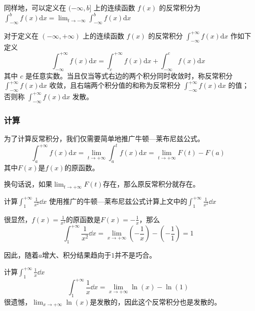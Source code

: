 同样地，可以定义在 $(-\infty,b]$ 上的连续函数 $f(x)$ 的反常积分为 $\displaystyle \int ^b _{-\infty}f(x)\mathrm{d} x=\lim_{t\rightarrow-\infty }\int ^b _{-\infty}f(x)\mathrm{d} x$

对于定义在 $(-\infty,+\infty )$ 上的连续函数 $f(x)$ 的反常积分 $\displaystyle \int ^{+\infty}_{-\infty}f(x)\mathrm{d} x$ 作如下定义
$$\displaystyle \int ^{+\infty}_{-\infty}f(x)\mathrm{d} x=\displaystyle \int ^{+\infty}_c f(x)\mathrm{d} x+\displaystyle \int ^c _{-\infty}f(x)\mathrm{d} x$$
其中 $c$ 是任意实数。当且仅当等式右边的两个积分同时收敛时，称反常积分 $\displaystyle \int ^{+\infty}_{-\infty}f(x)\mathrm{d} x$ 收敛，且右端两个积分值的和称为反常积分 $\displaystyle \int ^{+\infty}_{-\infty}f(x)\mathrm{d} x$ 的值；否则称 $\displaystyle \int ^{+\infty}_{-\infty}f(x)\mathrm{d} x$ 发散。

\subsubsection{计算}
为了计算反常积分，我们仅需要简单地推广牛顿—莱布尼兹公式。
\begin{equation}
\displaystyle \int ^{+\infty}_a f(x)\mathrm{d} x=\lim_{t\rightarrow+\infty }\int _a^{t}f(x)\mathrm{d} x
=\lim_{t\rightarrow+\infty }F(t) - F(a)
\end{equation}
其中$F(x)$是$f(x)$的原函数。

换句话说，如果$\lim_{t\rightarrow+\infty } F(t)$存在，那么原反常积分就存在。

\begin{example}{计算$\int^{+\infty}_1 \frac{1}{x^2} \dd x$}
使用推广的牛顿—莱布尼兹公式计算上文中的$\int^{+\infty}_1 \frac{1}{x^2} \dd x$

很显然，$f(x)=\frac{1}{x^2}$的原函数是$F(x)=-\frac{1}{x}$，那么
$$\int^{+\infty}_1 \frac{1}{x^2} \dd x=\lim_{x\rightarrow+\infty } (-\frac{1}{x}) - (-\frac{1}{1})=1$$

因此，随着$a$增大、积分结果趋向于$1$并不是巧合。
\end{example}

\begin{example}{计算$\int^{+\infty}_1 \frac{1}{x} \dd x$}
$$\int^{+\infty}_1 \frac{1}{x} \dd x=\lim_{x\rightarrow+\infty } {\ln(x)} - \ln(1)$$
很遗憾，$\lim_{x\rightarrow+\infty } {\ln(x)} $是发散的，因此这个反常积分也是发散的。
\end{example}

